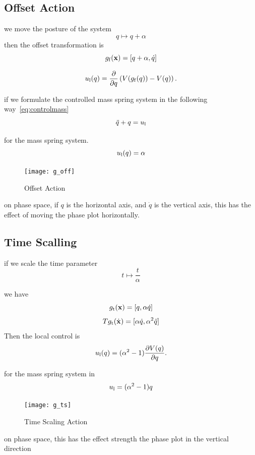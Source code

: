 \subsection*{ Offset Action}
we move the posture of the system 
\[
q \mapsto q+\alpha
\]
then the offset transformation is
\[
g_{\mathrm{f}}(\mathbf{x}) = [q+\alpha,\dot{q}]
\]


\begin{equation}
u_{\mathrm{l}}(q) = \frac{\partial}{\partial q} \left(V(g_{\mathrm{f}}(q)) - V(q)\right).
\end{equation}

if we formulate the controlled mass spring system in the following way~\ref{eq:controlmass}
\begin{equation}
\label{eq:controlmass}
\ddot{q}+q=u_{\mathrm{l}}
\end{equation}

for the mass spring system.
\[
u_{\mathrm{l}}(q)=\alpha
\]

\begin{figure}[!htbp]
  \begin{center}
      \texttt{[image: g\_off]}
    \caption{Offset Action}
    \label{fig:goff}
\end{center}
\end{figure}
on phase space, if $q$ is the horizontal axis, and $\dot{q}$ is the vertical axis, this has the effect of moving the phase plot horizontally.

\subsection*{Time Scalling}

if we scale the time parameter
\[
t \mapsto \frac{t}{\alpha}
\]

we have
\[
g_{\mathrm{t}}(\mathbf{x})=[q,\alpha \dot{q}]
\]
\[
Tg_{\mathrm{t}}(\dot{\mathbf{x}})=[\alpha \dot{q},\alpha^2 \ddot{q}]
\]
Then the local control is 
\begin{equation}
u_{\mathrm{l}}(q) = (\alpha^2 - 1) \frac{\partial V(q)}{\partial q}.
\end{equation}

for the mass spring system in
\[
u_{\mathrm{l}}=(\alpha^2-1)q
\] 

\begin{figure}[!htbp]
  \begin{center}
    \texttt{[image: g\_ts]}
	 \caption{Time Scaling Action}
    \label{fig:gts}
\end{center}
\end{figure}
on phase space, this has the effect strength the phase plot in the vertical direction


